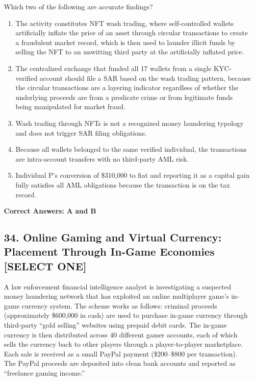 \documentclass[11pt,a4paper]{article}
\begin{document}
	Which two of the following are accurate findings?
	
	\begin{enumerate}[label=\Alph*.]
		\item The activity constitutes NFT wash trading, where self-controlled wallets artificially inflate the price of an asset through circular transactions to create a fraudulent market record, which is then used to launder illicit funds by selling the NFT to an unwitting third party at the artificially inflated price.
		\item The centralized exchange that funded all 17 wallets from a single KYC-verified account should file a SAR based on the wash trading pattern, because the circular transactions are a layering indicator regardless of whether the underlying proceeds are from a predicate crime or from legitimate funds being manipulated for market fraud.
		\item Wash trading through NFTs is not a recognized money laundering typology and does not trigger SAR filing obligations.
		\item Because all wallets belonged to the same verified individual, the transactions are intra-account transfers with no third-party AML risk.
		\item Individual P's conversion of \$310,000 to fiat and reporting it as a capital gain fully satisfies all AML obligations because the transaction is on the tax record.
	\end{enumerate}
	\textbf{Correct Answers: A and B}
	
	\subsection{34. Online Gaming and Virtual Currency: Placement Through In-Game Economies \textnormal{[SELECT ONE]}}
	
	A law enforcement financial intelligence analyst is investigating a suspected money laundering network that has exploited an online multiplayer game's in-game currency system. The scheme works as follows: criminal proceeds (approximately \$600,000 in cash) are used to purchase in-game currency through third-party ``gold selling'' websites using prepaid debit cards. The in-game currency is then distributed across 40 different gamer accounts, each of which sells the currency back to other players through a player-to-player marketplace. Each sale is received as a small PayPal payment (\$200--\$800 per transaction). The PayPal proceeds are deposited into clean bank accounts and reported as ``freelance gaming income.''
	
\end{document}
